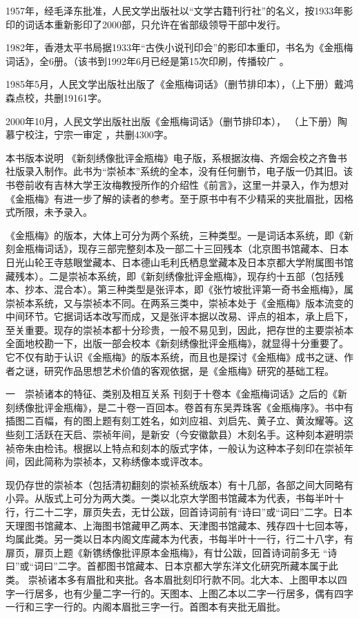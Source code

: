 \documentclass[a4paper,12pt,UTF8,twoside]{ctexbook}
\begin{document}
1957年，经毛泽东批准，人民文学出版社以“文学古籍刊行社”的名义，按1933年影印的词话本重新影印了2000部，只允许在省部级领导干部中发行。

1982年，香港太平书局据1933年“古佚小说刊印会”的影印本重印，书名为《金瓶梅词话》，全6册。（该书到1992年6月已经是第15次印刷，传播较广 。

1985年5月，人民文学出版社出版了《金瓶梅词话》（删节排印本），（上下册）戴鸿森点校，共删19161字。

2000年10月，人民文学出版社出版《金瓶梅词话》（删节排印本）， （上下册）陶慕宁校注，宁宗一审定 ，共删4300字。

本书版本说明
《新刻绣像批评金瓶梅》电子版，系根据汝梅、齐烟会校之齐鲁书社版录入制作。此书为“崇祯本”系统的全本，没有任何删节，电子版一仍其旧。该书卷前收有吉林大学王汝梅教授所作的介绍性《前言》，这里一并录入，作为想对《金瓶梅》有进一步了解的读者的参考。至于原书中有不少精采的夹批眉批，因格式所限，未予录入。

《金瓶梅》的版本，大体上可分为两个系统，三种类型。一是词话本系统，即《新刻金瓶梅词话》，现存三部完整刻本及一部二十三回残本（北京图书馆藏本、日本日光山轮王寺慈眼堂藏本、日本德山毛利氏栖息堂藏本及日本京都大学附属图书馆藏残本）。二是崇祯本系统，即《新刻绣像批评金瓶梅》，现存约十五部（包括残本、抄本、混合本）。第三种类型是张评本，即《张竹坡批评第一奇书金瓶梅》，属崇祯本系统，又与崇祯本不同。在两系三类中，崇祯本处于《金瓶梅》版本流变的中间环节。它据词话本改写而成，又是张评本据以改易、评点的祖本，承上启下，至关重要。现存的崇祯本都十分珍贵，一般不易见到，因此，把存世的主要崇祯本全面地校勘一下，出版一部会校本《新刻绣像批评金瓶梅》，就显得十分重要了。它不仅有助于认识《金瓶梅》的版本系统，而且也是探讨《金瓶梅》成书之谜、作者之谜，研究作品思想艺术价值的客观依据，是《金瓶梅》研究的基础工程。

一　崇祯诸本的特征、类别及相互关系
刊刻于十卷本《金瓶梅词话》之后的《新刻绣像批评金瓶梅》，是二十卷一百回本。卷首有东吴弄珠客《金瓶梅序》。书中有插图二百幅，有的图上题有刻工姓名，如刘应祖、刘启先、黄子立、黄汝耀等。这些刻工活跃在天启、崇祯年间，是新安（今安徽歙县）木刻名手。这种刻本避明崇祯帝朱由检讳。根据以上特点和刻本的版式字体，一般认为这种本子刻印在崇祯年间，因此简称为崇祯本，又称绣像本或评改本。

现仍存世的崇祯本（包括清初翻刻的崇祯系统版本）有十几部，各部之间大同略有小异。从版式上可分为两大类。一类以北京大学图书馆藏本为代表，书每半叶十行，行二十二字，扉页失去，无廿公跋，回首诗词前有“诗曰”或“词曰”二字。日本天理图书馆藏本、上海图书馆藏甲乙两本、天津图书馆藏本、残存四十七回本等，均属此类。另一类以日本内阁文库藏本为代表，书每半叶十一行，行二十八字，有扉页，扉页上题《新镌绣像批评原本金瓶梅》，有廿公跋，回首诗词前多无 “诗曰”或“词曰”二字。首都图书馆藏本、日本京都大学东洋文化研究所藏本属于此类。
崇祯诸本多有眉批和夹批。各本眉批刻印行款不同。北大本、上图甲本以四字一行居多，也有少量二字一行的。天图本、上图乙本以二字一行居多，偶有四字一行和三字一行的。内阁本眉批三字一行。首图本有夹批无眉批。
\end{document}
